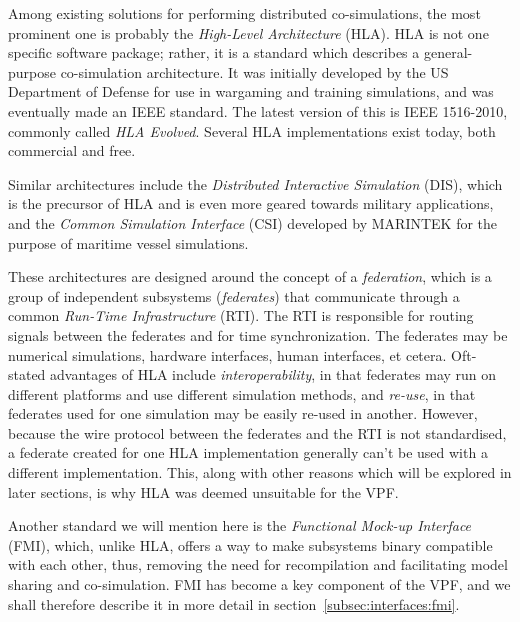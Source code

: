\documentclass[prb,aps,showpacs,floatfix,twocolumn,10pt]{revtex4-1}
\theoremstyle{plain}
\theoremstyle{remark}
\begin{document}
Among existing solutions for performing distributed co-simulations, the most prominent one is probably the \emph{High-Level Architecture} (HLA).
HLA is not one specific software package; rather, it is a standard which describes a general-purpose co-simulation architecture.
It was initially developed by the US Department of Defense for use in wargaming and training simulations, and was eventually made an IEEE standard.
The latest version of this is IEEE 1516-2010, commonly called \emph{HLA Evolved}.\cite{IEEE1516-2010}
Several HLA implementations exist today, both commercial and free.

Similar architectures include the \emph{Distributed Interactive Simulation}\cite{IEEE1278.1-2012} (DIS), which is the precursor of HLA and is even more geared towards military applications, and the \emph{Common Simulation Interface}\cite{Husteli2005} (CSI) developed by MARINTEK for the purpose of maritime vessel simulations.

These architectures are designed around the concept of a \emph{federation}, which is a group of independent subsystems (\emph{federates}) that communicate through a common \emph{Run-Time Infrastructure} (RTI).
The RTI is responsible for routing signals between the federates and for time synchronization.
The federates may be numerical simulations, hardware interfaces, human interfaces, et cetera.
Oft-stated advantages of HLA include \emph{interoperability}, in that federates may run on different platforms and use different simulation methods, and \emph{re-use}, in that federates used for one simulation may be easily re-used in another.
However, because the wire protocol between the federates and the RTI is not standardised, a federate created for one HLA implementation generally can't be used with a different implementation.
This, along with other reasons which will be explored in later sections, is why HLA was deemed unsuitable for the VPF.

Another standard we will mention here is the \emph{Functional Mock-up Interface} (FMI), which, unlike HLA, offers a way to make subsystems binary compatible with each other, thus, removing the need for recompilation and facilitating model sharing and co-simulation.
FMI has become a key component of the VPF, and we shall therefore describe it in more detail in section~\ref{subsec:interfaces:fmi}.





\end{document}

